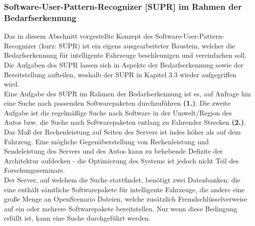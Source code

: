 \subsubsection{Software-User-Pattern-Recognizer [SUPR] im Rahmen der Bedarfserkennung}\label{2.3}
Das in diesem Abschnitt vorgestellte Konzept des Software-User-Pattern-Recognizer (kurz: SUPR) ist ein eigens ausgearbeiteter Baustein, welcher die Bedarfserkennung für intelligente Fahrzeuge beschleunigen und vereinfachen soll. Die Aufgaben des SUPR lassen sich in Aspekte der Bedarfserkennung sowie der Bereitstellung aufteilen, weshalb der SUPR in Kapitel 3.3 wieder aufgegriffen wird.\\
Eine Aufgabe des SUPR im Rahmen der Bedarfserkennung ist es, auf Anfrage hin eine Suche nach passenden Softwarepaketen durchzuführen \textbf{(1.)}. Die zweite Aufgabe ist die regelmäßige Suche nach Software in der Umwelt/Region des Autos bzw. die Suche nach Softwarepaketen entlang zu Fahrender Strecken \textbf{(2.)}. Das Maß der Rechenleistung auf Seiten des Servers ist indes höher als auf dem Fahrzeug. Eine mögliche Gegenüberstellung von Rechenleistung und Sendeleistung des Servers und des Autos kann zu behebende Defizite der Architektur aufdecken - die Optimierung des Systems ist jedoch nicht Teil des Forschungsseminars.\\
Der Server, auf welchem die Suche stattfindet, benötigt zwei Datenbanken: die eine enthält sämtliche Softwarepakete für intelligente Fahrzeuge, die andere eine große Menge an OpenScenario Dateien, welche zusätzlich Fremdschlüsselverweise auf ein oder mehrere Softwarepakete bereitstellen. Nur wenn diese Bedingung erfüllt ist, kann eine Suche durchgeführt werden. 

